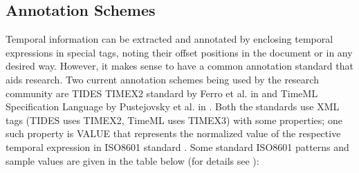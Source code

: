 \subsection{Annotation Schemes} \label{ss2as}
Temporal information can be extracted and annotated by enclosing temporal expressions in special tags, noting their offset positions in the document or in any desired way. However, it makes sense to have a common annotation standard that aids research. Two current annotation schemes being used by the research community are TIDES TIMEX2 standard by Ferro et al. in \cite{ferro2001tides, ferro2005tides} and TimeML Specification Language by Pustejovsky et al. in \cite{DBLP:journals/lre/PustejovskyKLS05, DBLP:conf/ndqa/PustejovskyCISGSKR03}. Both the standards use XML tags (TIDES uses TIMEX2, TimeML uses TIMEX3) with some properties; one such property is VALUE that represents the normalized value of the respective temporal expression in ISO8601 standard \cite{iso86012000data}. Some standard ISO8601 patterns and sample values are given in the table below (for details see \cite{iso86012000data}):

